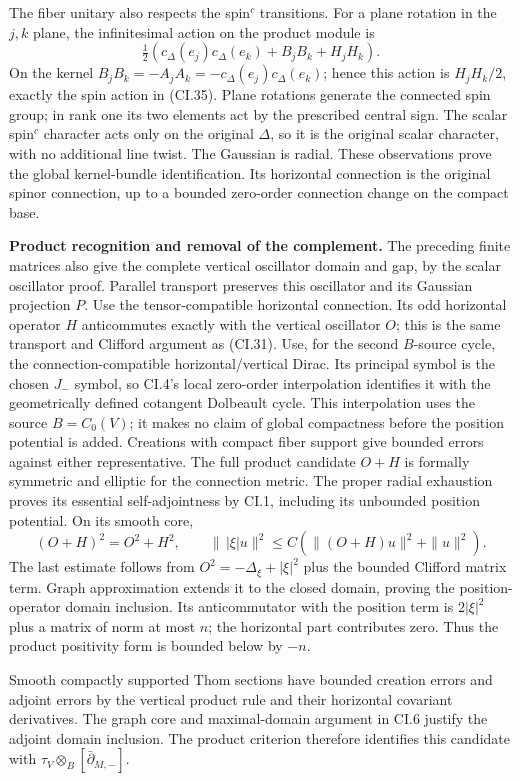\documentclass[
  11pt,
]{article}
\begin{document}
The fiber unitary also respects the spin\(^{c}\) transitions. For a
plane rotation in the \(j,k\) plane, the infinitesimal action on the
product module is \[
 \tfrac12(c_\Delta(e_j)c_\Delta(e_k)+B_jB_k+H_jH_k).
\] On the kernel \(B_jB_k=-A_jA_k=-c_\Delta(e_j)c_\Delta(e_k)\); hence
this action is \(H_jH_k/2\), exactly the spin action in (CI.35). Plane
rotations generate the connected spin group; in rank one its two
elements act by the prescribed central sign. The scalar spin\(^{c}\)
character acts only on the original \(\Delta\), so it is the original
scalar character, with no additional line twist. The Gaussian is radial.
These observations prove the global kernel-bundle identification. Its
horizontal connection is the original spinor connection, up to a bounded
zero-order connection change on the compact base.

\textbf{Product recognition and removal of the complement.} The
preceding finite matrices also give the complete vertical oscillator
domain and gap, by the scalar oscillator proof. Parallel transport
preserves this oscillator and its Gaussian projection \(P\). Use the
tensor-compatible horizontal connection. Its odd horizontal operator
\(H\) anticommutes exactly with the vertical oscillator \(O\); this is
the same transport and Clifford argument as (CI.31). Use, for the second
\(B\)-source cycle, the connection-compatible horizontal/vertical Dirac.
Its principal symbol is the chosen \(J_-\) symbol, so CI.4's local
zero-order interpolation identifies it with the geometrically defined
cotangent Dolbeault cycle. This interpolation uses the source
\(B=C_0(V)\); it makes no claim of global compactness before the
position potential is added. Creations with compact fiber support give
bounded errors against either representative. The full product candidate
\(O+H\) is formally symmetric and elliptic for the connection metric.
The proper radial exhaustion proves its essential self-adjointness by
CI.1, including its unbounded position potential. On its smooth core, \[
 (O+H)^2=O^2+H^2,\qquad
 \|\,|\xi|u\|^2\leq C(\|(O+H)u\|^2+\|u\|^2).
 \tag{CI.36}
\] The last estimate follows from \(O^2=-\Delta_\xi+|\xi|^2\) plus the
bounded Clifford matrix term. Graph approximation extends it to the
closed domain, proving the position-operator domain inclusion. Its
anticommutator with the position term is \(2|\xi|^2\) plus a matrix of
norm at most \(n\); the horizontal part contributes zero. Thus the
product positivity form is bounded below by \(-n\).

Smooth compactly supported Thom sections have bounded creation errors
and adjoint errors by the vertical product rule and their horizontal
covariant derivatives. The graph core and maximal-domain argument in
CI.6 justify the adjoint domain inclusion. The product criterion
therefore identifies this candidate with
\(\tau_V\otimes_B[\bar\partial_{M,-}]\).
\end{document}

